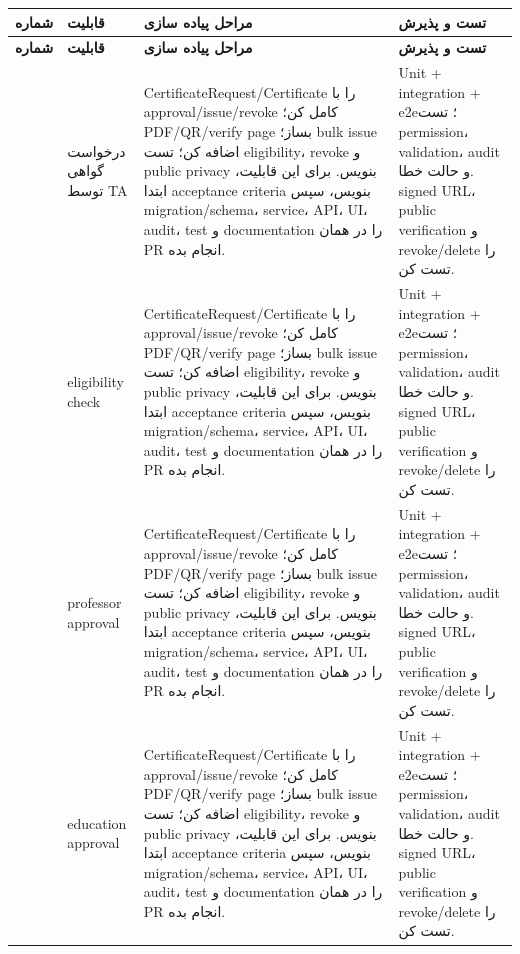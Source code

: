 \documentclass[11pt,a4paper]{article}
\begin{document}
\begin{longtable}{|>{\raggedleft\arraybackslash}p{}|>{\raggedleft\arraybackslash}p{}|>{\raggedleft\arraybackslash}p{}|>{\raggedleft\arraybackslash}p{}|}
\hline
\textbf{شماره} & \textbf{قابلیت} & \textbf{مراحل پیاده سازی} & \textbf{تست و پذیرش} \\\hline
\endfirsthead
\hline
\textbf{شماره} & \textbf{قابلیت} & \textbf{مراحل پیاده سازی} & \textbf{تست و پذیرش} \\\hline
\endhead
201 & درخواست گواهی توسط TA & CertificateRequest/Certificate را با approval/issue/revoke کامل کن؛ PDF/QR/verify page بساز؛ bulk issue اضافه کن؛ تست eligibility، revoke و public privacy بنویس. برای این قابلیت، ابتدا acceptance criteria بنویس، سپس migration/schema، service، API، UI، audit، test و documentation را در همان PR انجام بده. & Unit + integration + e2e؛ تست permission، validation، audit و حالت خطا. signed URL، public verification و revoke/delete را تست کن. \\ \hline
202 & eligibility check & CertificateRequest/Certificate را با approval/issue/revoke کامل کن؛ PDF/QR/verify page بساز؛ bulk issue اضافه کن؛ تست eligibility، revoke و public privacy بنویس. برای این قابلیت، ابتدا acceptance criteria بنویس، سپس migration/schema، service، API، UI، audit، test و documentation را در همان PR انجام بده. & Unit + integration + e2e؛ تست permission، validation، audit و حالت خطا. signed URL، public verification و revoke/delete را تست کن. \\ \hline
203 & professor approval & CertificateRequest/Certificate را با approval/issue/revoke کامل کن؛ PDF/QR/verify page بساز؛ bulk issue اضافه کن؛ تست eligibility، revoke و public privacy بنویس. برای این قابلیت، ابتدا acceptance criteria بنویس، سپس migration/schema، service، API، UI، audit، test و documentation را در همان PR انجام بده. & Unit + integration + e2e؛ تست permission، validation، audit و حالت خطا. signed URL، public verification و revoke/delete را تست کن. \\ \hline
204 & education approval & CertificateRequest/Certificate را با approval/issue/revoke کامل کن؛ PDF/QR/verify page بساز؛ bulk issue اضافه کن؛ تست eligibility، revoke و public privacy بنویس. برای این قابلیت، ابتدا acceptance criteria بنویس، سپس migration/schema، service، API، UI، audit، test و documentation را در همان PR انجام بده. & Unit + integration + e2e؛ تست permission، validation، audit و حالت خطا. signed URL، public verification و revoke/delete را تست کن. \\ \hline

\end{longtable}
\end{document}
